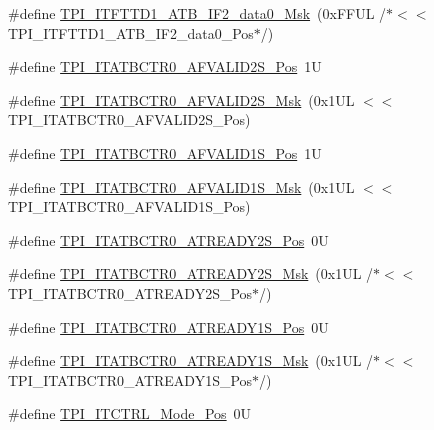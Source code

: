 \begin{DoxyCompactItemize}
\item 
\#define \hyperlink{group___c_m_s_i_s___t_p_i_gaf688adf6b3790de906b3f50bc89eaaed}{T\+P\+I\+\_\+\+I\+T\+F\+T\+T\+D1\+\_\+\+A\+T\+B\+\_\+\+I\+F2\+\_\+data0\+\_\+\+Msk}~(0x\+F\+F\+U\+L /$\ast$$<$$<$ T\+P\+I\+\_\+\+I\+T\+F\+T\+T\+D1\+\_\+\+A\+T\+B\+\_\+\+I\+F2\+\_\+data0\+\_\+\+Pos$\ast$/)
\item 
\#define \hyperlink{group___c_m_s_i_s___t_p_i_ga1ca17a69fe70e2cb87f04a2160bca51a}{T\+P\+I\+\_\+\+I\+T\+A\+T\+B\+C\+T\+R0\+\_\+\+A\+F\+V\+A\+L\+I\+D2\+S\+\_\+\+Pos}~1U
\item 
\#define \hyperlink{group___c_m_s_i_s___t_p_i_ga8d47192a54ef5a7e9086d4c949f33b24}{T\+P\+I\+\_\+\+I\+T\+A\+T\+B\+C\+T\+R0\+\_\+\+A\+F\+V\+A\+L\+I\+D2\+S\+\_\+\+Msk}~(0x1\+U\+L $<$$<$ T\+P\+I\+\_\+\+I\+T\+A\+T\+B\+C\+T\+R0\+\_\+\+A\+F\+V\+A\+L\+I\+D2\+S\+\_\+\+Pos)
\item 
\#define \hyperlink{group___c_m_s_i_s___t_p_i_gac2018f988c8306301a11a8f08af67d2c}{T\+P\+I\+\_\+\+I\+T\+A\+T\+B\+C\+T\+R0\+\_\+\+A\+F\+V\+A\+L\+I\+D1\+S\+\_\+\+Pos}~1U
\item 
\#define \hyperlink{group___c_m_s_i_s___t_p_i_ga8ea98aa5bb5a223e409213ef9a754cbd}{T\+P\+I\+\_\+\+I\+T\+A\+T\+B\+C\+T\+R0\+\_\+\+A\+F\+V\+A\+L\+I\+D1\+S\+\_\+\+Msk}~(0x1\+U\+L $<$$<$ T\+P\+I\+\_\+\+I\+T\+A\+T\+B\+C\+T\+R0\+\_\+\+A\+F\+V\+A\+L\+I\+D1\+S\+\_\+\+Pos)
\item 
\#define \hyperlink{group___c_m_s_i_s___t_p_i_ga0ca42c4782e0a5421c34b14a0183c220}{T\+P\+I\+\_\+\+I\+T\+A\+T\+B\+C\+T\+R0\+\_\+\+A\+T\+R\+E\+A\+D\+Y2\+S\+\_\+\+Pos}~0U
\item 
\#define \hyperlink{group___c_m_s_i_s___t_p_i_ga07713088c6abb2ab14efa3a0e0b9e454}{T\+P\+I\+\_\+\+I\+T\+A\+T\+B\+C\+T\+R0\+\_\+\+A\+T\+R\+E\+A\+D\+Y2\+S\+\_\+\+Msk}~(0x1\+U\+L /$\ast$$<$$<$ T\+P\+I\+\_\+\+I\+T\+A\+T\+B\+C\+T\+R0\+\_\+\+A\+T\+R\+E\+A\+D\+Y2\+S\+\_\+\+Pos$\ast$/)
\item 
\#define \hyperlink{group___c_m_s_i_s___t_p_i_ga616d6fbe0522ce0c5ad1711d33509907}{T\+P\+I\+\_\+\+I\+T\+A\+T\+B\+C\+T\+R0\+\_\+\+A\+T\+R\+E\+A\+D\+Y1\+S\+\_\+\+Pos}~0U
\item 
\#define \hyperlink{group___c_m_s_i_s___t_p_i_ga6211d550c37ce45f9593ddf98d71f6eb}{T\+P\+I\+\_\+\+I\+T\+A\+T\+B\+C\+T\+R0\+\_\+\+A\+T\+R\+E\+A\+D\+Y1\+S\+\_\+\+Msk}~(0x1\+U\+L /$\ast$$<$$<$ T\+P\+I\+\_\+\+I\+T\+A\+T\+B\+C\+T\+R0\+\_\+\+A\+T\+R\+E\+A\+D\+Y1\+S\+\_\+\+Pos$\ast$/)
\item 
\#define \hyperlink{group___c_m_s_i_s___t_p_i_gaa847adb71a1bc811d2e3190528f495f0}{T\+P\+I\+\_\+\+I\+T\+C\+T\+R\+L\+\_\+\+Mode\+\_\+\+Pos}~0U

\end{DoxyCompactItemize}
